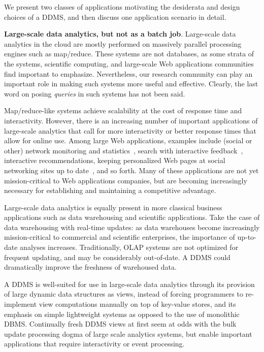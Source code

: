 
\medskip

We present two classes of applications motivating the de\-si\-derata and
design choices of a DDMS, and then discuss one application scenario in detail.

{\bf Large-scale data analytics, but not as a batch job}\/.
%
Large-scale data analytics in the cloud are mostly performed on massively
parallel processing engines such as map/reduce. These systems are not databases,
as some strata of the systems, scientific computing, and large-scale Web
applications communities find important to emphasize. Nevertheless, our research
community can play an important role in making such systems more useful and
effective. Clearly, the last word on posing {\em queries}\/ in such systems
has not been said.

Map/reduce-like systems achieve scalability at the cost of response time and
interactivity.
However, there is an increasing number of important applications of large-scale
analytics that call for more interactivity or better response times that allow
for online use. Among large Web applications, examples include (social or other)
network monitoring and statistics~\cite{olston-cidr:09}, search with interactive
feedback~\cite{bast-cidr:07}, interactive recommendations, keeping personalized
Web pages at social networking sites up to date~\cite{fu-sigmod:10}, and so
forth.
Many of these applications are not yet mission-critical to Web applications
companies, but are becoming increasingly necessary for establishing and 
maintaining a competitive advantage.

Large-scale data analytics is equally present in more classical business
applications such as data warehousing and scientific applications. Take the
case of data warehousing with real-time updates: as data warehouses become
increasingly mission-critical to commercial and scientific enterprises, the
importance of up-to-date analyses increases. Traditionally, OLAP systems are not
optimized for frequent updating, and may be considerably out-of-date. A DDMS 
could dramatically improve the freshness of warehoused data.

A DDMS is well-suited for use in large-scale data analytics through its provision of
large dynamic data structures as views, instead of forcing programmers to
re-implement view computations manually on top of key-value stores, and its
emphasis on simple lightweight systems as opposed to the use of monolithic DBMS.
Continually fresh DDMS views at first seem at odds with the bulk update
processing dogma of large scale analytics systems, but enable important
applications that require interactivity or event processing.


